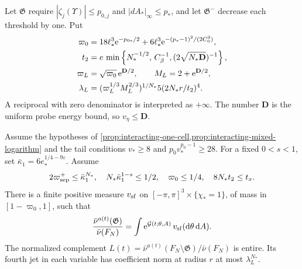 \documentclass[11pt,letterpaper,reqno]{amsart}
\newcommand{\dd}{\mathrm d}
\begin{document}
Let $\mathfrak G$ require
$|\zeta_j(\Upsilon)|\le p_{0,j}$
and $|dA_*|_\infty\le p_*$, and let
$\mathfrak G^-$ decrease each threshold by one.
Put
\begin{align}
 \varpi_0&=18\ell_*^3\mathrm e^{-p_{0*}/2}
               +6\ell_*^3\mathrm e^{-(p_*-1)^2/(2C_0^2)},\notag\\
 t_2&=e\,\min\left\{N_*^{-1/2},\,C_\beta^{-1},
                                     (2\sqrt{N_*\mathbf D})^{-1}\right\},\notag\\
 \varpi_L&=\sqrt{\varpi_0}\,\mathrm e^{\mathbf D/2},
 \qquad M_L=2+\mathrm e^{\mathbf D/2},\notag\\
 \lambda_L&=(\varpi_L^{1/3}M_L^{2/3})^{1/N_*}
                              5(2N_*r/t_2)^4 .
                                     \label{eq:interacting-complement-constants}
\end{align}
A reciprocal with zero denominator is interpreted
as $+\infty$. The number $\mathbf D$ is the
uniform probe energy bound, so $v_\eta\le\mathbf D$.

\begin{proposition}\label{prop:interacting-complement}
Assume the hypotheses of \cref{prop:interacting-one-cell,prop:interacting-mixed-logarithm}
and the tail conditions $v_*\ge8$ and $p_0v_*^{p_0-1}\ge28$.
For a fixed $0<s<1$, set
$\bar\kappa_1=6e_*^{1/4-9\varepsilon}$.
Assume
\begin{equation}\label{eq:interacting-jet-conditions}
 2\varpi_{\rm sep}^+\le\bar\kappa_1^{N_*},\quad
 N_*\bar\kappa_1^{1-s}\le1/2,\quad
 \varpi_0\le1/4,\quad 8N_*t_2\le t_x .
\end{equation}
There is a finite positive measure $v_{\rm sf}$
on $[-\pi,\pi]^3\times\{\chi_*=1\}$, of
mass in $[1-\varpi_0,1]$, such that
\begin{equation}\label{eq:interacting-small-field-representation}
 \frac{\bar\nu^{a(t)}(\mathfrak G)}{\bar\nu(F_N)}
       =\int \mathrm e^{\mathcal G(t;\theta,A)}\,v_{\rm sf}(\dd\theta\,\dd A).
\end{equation}
The normalized complement
$L(t)=\bar\nu^{a(t)}(F_N\setminus\mathfrak G)/\bar\nu(F_N)$
is entire. Its fourth jet in each variable has
coefficient norm at radius $r$ at most
$\lambda_L^{N_*}$.
\end{proposition}
\end{document}
